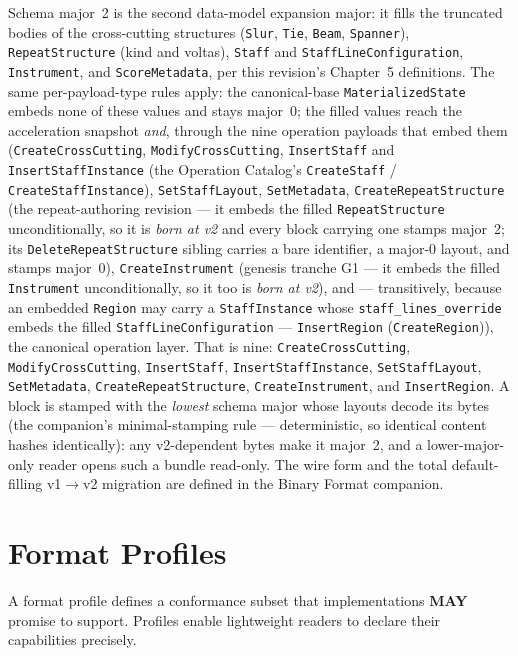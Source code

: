 \documentclass[11pt,letterpaper]{report}
\newcommand{\MAY}{\textbf{MAY}}
\begin{document}
Schema major~2 is the second data-model expansion major: it fills the
truncated bodies of the cross-cutting structures (\texttt{Slur},
\texttt{Tie}, \texttt{Beam}, \texttt{Spanner}), \texttt{RepeatStructure}
(kind and voltas), \texttt{Staff} and \texttt{StaffLineConfiguration},
\texttt{Instrument}, and \texttt{ScoreMetadata}, per this revision's
Chapter~5 definitions. The same per-payload-type rules apply: the
canonical-base \texttt{MaterializedState} embeds none of these values and
stays major~0; the filled values reach the acceleration snapshot
\emph{and}, through the nine operation payloads that embed them
(\texttt{CreateCrossCutting}, \texttt{ModifyCrossCutting},
\texttt{InsertStaff} and \texttt{InsertStaffInstance} (the Operation
Catalog's \texttt{CreateStaff} / \texttt{CreateStaffInstance}),
\texttt{SetStaffLayout}, \texttt{SetMetadata},
\texttt{CreateRepeatStructure} (the repeat-authoring revision --- it
embeds the filled \texttt{RepeatStructure} unconditionally, so it is
\emph{born at v2} and every block carrying one stamps major~2; its
\texttt{DeleteRepeatStructure} sibling carries a bare identifier, a
major-0 layout, and stamps major~0), \texttt{CreateInstrument} (genesis
tranche G1 --- it embeds the filled \texttt{Instrument} unconditionally, so
it too is \emph{born at v2}), and --- transitively,
because an embedded \texttt{Region} may carry a \texttt{StaffInstance}
whose \texttt{staff\_lines\_override} embeds the filled
\texttt{StaffLineConfiguration} --- \texttt{InsertRegion}
(\texttt{CreateRegion})), the canonical operation layer. That is nine:
\texttt{CreateCrossCutting}, \texttt{ModifyCrossCutting},
\texttt{InsertStaff}, \texttt{InsertStaffInstance}, \texttt{SetStaffLayout},
\texttt{SetMetadata}, \texttt{CreateRepeatStructure}, \texttt{CreateInstrument},
and \texttt{InsertRegion}. A block is
stamped with the \emph{lowest} schema major whose layouts decode its
bytes (the companion's minimal-stamping rule --- deterministic, so
identical content hashes identically): any v2-dependent bytes make it
major~2, and a lower-major-only reader opens such a bundle read-only. The wire form
and the total default-filling v1${\to}$v2 migration are defined in the
Binary Format companion.

\section{Format Profiles}
\label{sec:format:profiles}

A format profile defines a conformance subset that implementations
\MAY{} promise to support. Profiles enable lightweight readers to
declare their capabilities precisely.
\end{document}
